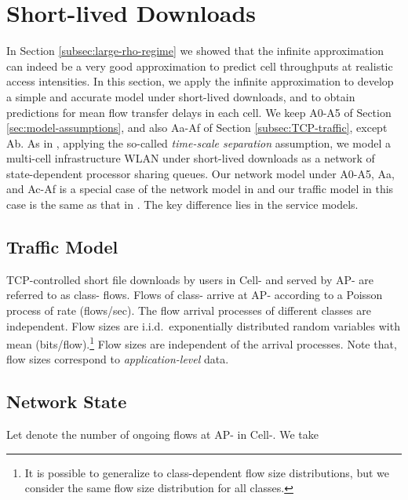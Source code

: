 \documentclass[10pt,a4paper,journal]{IEEEtran}
\theoremstyle{definition}
\theoremstyle{remark}
\theoremstyle{plain}
\begin{document}
\section{Short-lived Downloads}
\label{sec:short-lived}

In Section \ref{subsec:large-rho-regime} we showed that the infinite  approximation can indeed be a very good approximation to predict cell throughputs at realistic access intensities. In this section, we apply the infinite  approximation to develop a simple and accurate model under short-lived downloads, and to obtain predictions for mean flow transfer delays in each cell. We keep A0-A5 of Section \ref{sec:model-assumptions}, and also Aa-Af of Section \ref{subsec:TCP-traffic}, except Ab. As in \cite{wanet.bonald08multicellprocsharing}, applying the so-called \textit{time-scale separation} assumption, we model a multi-cell infrastructure WLAN under short-lived downloads as a network of state-dependent processor sharing queues. Our network model under A0-A5, Aa, and Ac-Af is a special case of the network model in \cite{wanet.bonald08multicellprocsharing} and our traffic model in this case is the same as that in \cite{wanet.bonald08multicellprocsharing}. The key difference lies in the service models. 




\subsection{Traffic Model}
\label{subsubsec:traffic-model}

TCP-controlled short file downloads by users in Cell- and served by AP- are referred to as class- flows. Flows of class- arrive at AP- according to a Poisson process of rate  (flows/sec). The flow arrival processes of different classes are independent. Flow sizes are i.i.d.~exponentially distributed random variables with mean  (bits/flow).\footnote{It is possible to generalize to class-dependent flow size distributions, but we consider the same flow size distribution for all classes.} Flow sizes are independent of the arrival processes. Note that, flow sizes correspond to \textit{application-level} data.


\subsection{Network State}
\label{subsubsec:network-state}

Let  denote the number of ongoing flows at AP- in Cell-. We take 
 
\end{document}
